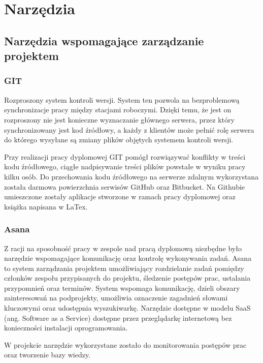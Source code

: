 \newpage
\section{Narzędzia}
\label{cha:Narzędzia}

\subsection{Narzędzia wspomagające zarządzanie projektem}

\subsubsection{GIT}
\label{sub:GIT}
Rozproszony system kontroli wersji. System ten pozwola na bezproblemową synchronizacje pracy między stacjami roboczymi. Dzięki temu, że jest on rozproszony nie jest konieczne wyznaczanie głównego serwera, przez który synchronizowany jest kod źródłowy, a każdy z klientów może pełnić rolę serwera do którego wysyłane są zmiany plików objętych systemem kontroli wersji.

Przy realizacji pracy dyplomowej GIT pomógł rozwiązywać konflikty w treści kodu źródłowego, ciągłe nadpisywanie treści plików powstałe w wyniku pracy kilku osób. Do przechowania kodu źródłowego na serwerze zdalnym wykorzystana została darmowa powierzchnia serwisów GitHub oraz Bitbucket. Na Githubie umieszczone zostały aplikacje stworzone w ramach pracy dyplomowej oraz książka napisana w LaTex.


\subsubsection{Asana}
\label{sub:Asana}

Z racji na sposobność pracy w zespole nad pracą dyplomową niezbędne było narzędzie wspomagające komunikację oraz kontrolę wykonywania zadań. Asana to system zarządzania projektem umożliwiający rozdzielanie zadań pomiędzy członków zespołu przypisanych do projektu, śledzenie postępów prac, ustalania przypomnień oraz terminów. System wspomaga komunikację, dzieli obszary zainteresowań na podprojekty, umożliwia oznaczenie zagadnień słowami kluczowymi oraz udostępnia wyszukiwarkę. Narzędzie dostępne w modelu SaaS (ang. Software as a Service) dostępne przez przeglądarkę internetową bez konieczności instalacji oprogramowania.

W projekcie narzędzie wykorzystane zostało do monitorowania postępów prac oraz tworzenie bazy wiedzy.

